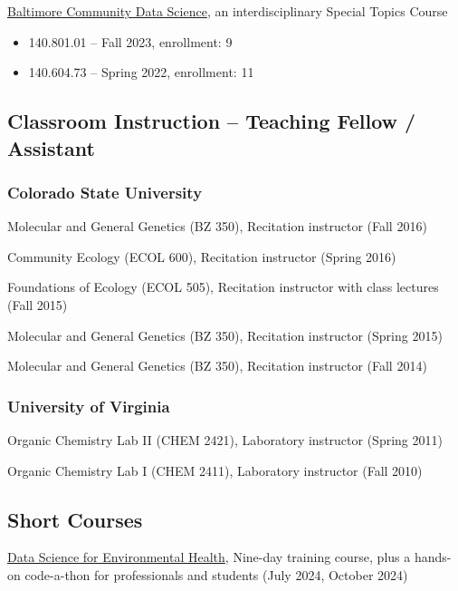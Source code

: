 \documentclass{cv}
\begin{document}
\href{https://jhudatascience.org/Baltimore_Community_Course/index.html}{Baltimore Community Data Science}, an interdisciplinary Special Topics Course

\begin{itemize}

\item 140.801.01 -- Fall 2023, enrollment: 9

\item 140.604.73 -- Spring 2022, enrollment: 11

\end{itemize}

\subsection*{Classroom Instruction -- Teaching Fellow / Assistant}

\subsubsection*{Colorado State University}

Molecular and General Genetics (BZ 350), Recitation instructor (Fall 2016)

Community Ecology (ECOL 600), Recitation instructor (Spring 2016)

Foundations of Ecology (ECOL 505), Recitation instructor with class lectures (Fall 2015)

Molecular and General Genetics (BZ 350), Recitation instructor (Spring 2015)

Molecular and General Genetics (BZ 350), Recitation instructor (Fall 2014)

\subsubsection*{University of Virginia}

Organic Chemistry Lab II (CHEM 2421), Laboratory instructor (Spring 2011)

Organic Chemistry Lab I (CHEM 2411), Laboratory instructor (Fall 2010)

\subsection*{Short Courses}

\href{}{Data Science for Environmental Health}, Nine-day training course, plus a hands-on code-a-thon for professionals and students (July 2024, October 2024)
\end{document}
